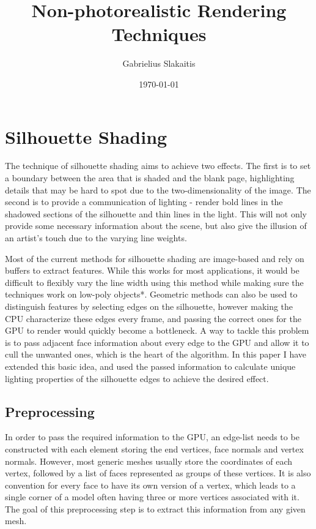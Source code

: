 \documentclass[a4paper, 12pt]{article}
\begin{document}
\title{Non-photorealistic Rendering Techniques}
\author{Gabrielius Slakaitis}
\date{\today}
\maketitle

\newpage
\section{Silhouette Shading}
The technique of silhouette shading aims to achieve two effects. The first is to set a boundary between the area that is shaded and the blank page, highlighting details that may be hard to spot due to the two-dimensionality of the image. The second is to provide a communication of lighting - render bold lines in the shadowed sections of the silhouette and thin lines in the light. This will not only provide some necessary information about the scene, but also give the illusion of an artist's touch due to the varying line weights.

Most of the current methods for silhouette shading are image-based and rely on buffers to extract features. While this works for most applications, it would be difficult to flexibly vary the line width using this method while making sure the techniques work on low-poly objects*. Geometric methods can also be used to distinguish features by selecting edges on the silhouette, however making the CPU characterize these edges every frame, and passing the correct ones for the GPU to render would quickly become a bottleneck. A way to tackle this problem is to pass adjacent face information about every edge to the GPU and allow it to cull the unwanted ones, which is the heart of the algorithm. In this paper I have extended this basic idea, and used the passed information to calculate unique lighting properties of the silhouette edges to achieve the desired effect.

\subsection{Preprocessing}

In order to pass the required information to the GPU, an edge-list needs to be constructed with each element storing the end vertices, face normals and vertex normals. However, most generic meshes usually store the coordinates of each vertex, followed by a list of faces represented as groups of these vertices. It is also convention for every face to have its own version of a vertex, which leads to a single corner of a model often having three or more vertices associated with it. The goal of this preprocessing step is to extract this information from any given mesh.
\end{document}
